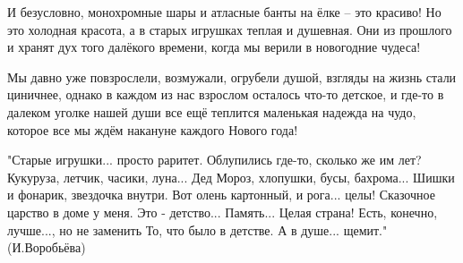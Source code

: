 И безусловно, монохромные шары и атласные банты на ёлке – это красиво! Но это
холодная красота, а в старых игрушках теплая и душевная. Они из прошлого и
хранят дух того  далёкого  времени, когда мы верили в новогодние чудеса!

Мы давно уже повзрослели, возмужали, огрубели душой, взгляды на жизнь стали
циничнее, однако в каждом из нас взрослом осталось что-то детское, и  где-то в
далеком уголке нашей души все ещё теплится маленькая надежда на чудо, которое
все мы ждём накануне каждого Нового года!

\obeycr
"Старые игрушки... просто раритет.
Облупились где-то, сколько же им лет?
Кукуруза, летчик, часики, луна...
Дед Мороз, хлопушки, бусы, бахрома...
Шишки и фонарик, звездочка внутри.
Вот олень картонный, и рога... целы!
Сказочное царство в доме у меня.
Это - детство... Память... Целая страна!
Есть, конечно, лучше..., но не заменить
То, что было в детстве. А в душе... щемит."
\smallskip
(И.Воробьёва)
\restorecr

